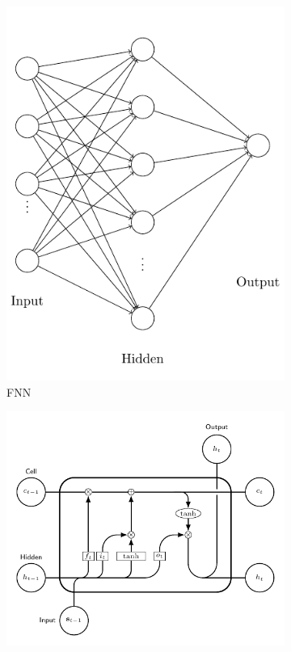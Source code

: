 \begin{figure}[ht!]
    \centering
    \begin{subfigure}{0.45\textwidth}
        \includegraphics[width=\textwidth]{./project3/tikz/fnn.pdf}
        \caption{FNN}
        \label{subfig3:fnn}
    \end{subfigure}
    \hspace{1cm}
    \begin{subfigure}{0.45\textwidth}
        \includegraphics[width=\textwidth]{./project3/tikz/lstm.pdf}

\end{subfigure}
\end{figure}
